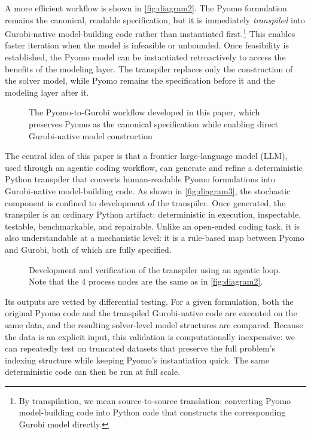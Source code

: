 \documentclass[runningheads]{llncs}
\begin{document}
A more efficient workflow is shown in \autoref{fig:diagram2}. The Pyomo formulation remains the canonical, readable specification, but it is immediately \textit{transpiled} into Gurobi-native model-building code rather than instantiated first.\footnote{By transpilation, we mean source-to-source translation: converting Pyomo model-building code into Python code that constructs the corresponding Gurobi model directly.
} This enables faster iteration when the model is infeasible or unbounded. Once feasibility is established, the Pyomo model can be instantiated retroactively to access the benefits of the modeling layer. The transpiler replaces only the construction of the solver model, while Pyomo remains the specification before it and the modeling layer after it.

\begin{figure}[H]
    \centering
    
    \caption{The Pyomo-to-Gurobi workflow developed in this paper, which preserves Pyomo as the canonical specification while enabling direct Gurobi-native model construction
    }
    \label{fig:diagram2}
\end{figure}

The central idea of this paper is that a frontier large-language model (LLM), used through an agentic coding workflow, can generate and refine a deterministic Python transpiler that converts human-readable Pyomo formulations into Gurobi-native model-building code. As shown in \autoref{fig:diagram3}, the stochastic component is confined to development of the transpiler. Once generated, the transpiler is an ordinary Python artifact: deterministic in execution, inspectable, testable, benchmarkable, and repairable. Unlike an open-ended coding task, it is also understandable at a mechanistic level: it is a rule-based map between Pyomo and Gurobi, both of which are fully specified.

\begin{figure}[H]
    \centering
    
    \caption{Development and verification of the transpiler using an agentic loop. Note that the 4 process nodes are the same as in \autoref{fig:diagram2}.}
    \label{fig:diagram3}
\end{figure}

Its outputs are vetted by differential testing. For a given formulation, both the original Pyomo code and the transpiled Gurobi-native code are executed on the same data, and the resulting solver-level model structures are compared. Because the data is an explicit input, this validation is computationally inexpensive: we can repeatedly test on truncated datasets that preserve the full problem's indexing structure while keeping Pyomo's instantiation quick. The same deterministic code can then be run at full scale.
\end{document}
